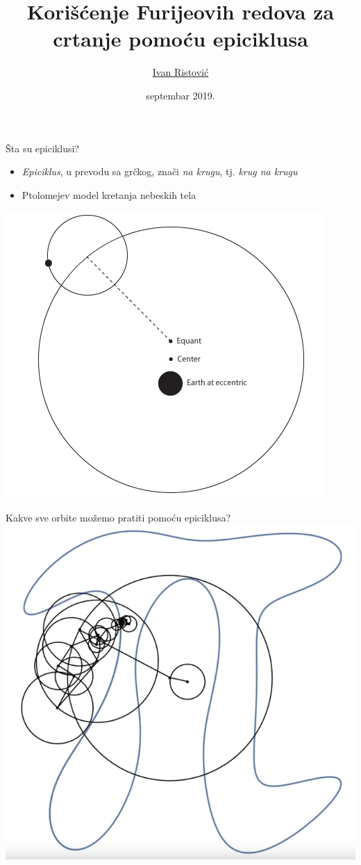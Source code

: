 \documentclass{beamer}
\title{Kori\v{s}\'c{}enje Furijeovih redova za crtanje pomo\'c{}u epiciklusa}
\author{\href{mailto:ivan_ristovic@math.rs}{Ivan Ristović}}
\date{septembar 2019.}
\begin{document}
\begin{frame}
    \titlepage
\end{frame}

\begin{frame}{\v{S}ta su epiciklusi?}
    \begin{itemize}
        \item \emph{Epiciklus}, u prevodu sa gr\v{c}kog, zna\v{c}i \emph{na krugu}, tj. \emph{krug na krugu}
        \item Ptolomejev model kretanja nebeskih tela
    \end{itemize}
    \centering
    \includegraphics[scale=0.5]{images/ptolomaic_model.PNG}
\end{frame}

\begin{frame}{Kakve sve orbite mo\v{z}emo pratiti pomo\'c{}u epiciklusa?}
    \centering
    \includegraphics[scale=0.35]{images/ep2.PNG}
\end{frame}
\end{document}
